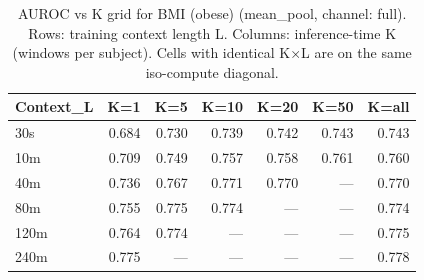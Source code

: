 \begin{table}[ht]
\centering
\caption{AUROC vs K grid for BMI (obese) (mean_pool, channel: full). Rows: training context length L. Columns: inference-time K (windows per subject). Cells with identical K×L are on the same iso-compute diagonal.}
\label{tab:kgrid_bmi_binary_mean_pool_full}
\begin{tabular}{lrrrrrr}
\toprule
Context_L & K=1 & K=5 & K=10 & K=20 & K=50 & K=all \\
\midrule
30s & 0.684 & 0.730 & 0.739 & 0.742 & 0.743 & 0.743 \\
10m & 0.709 & 0.749 & 0.757 & 0.758 & 0.761 & 0.760 \\
40m & 0.736 & 0.767 & 0.771 & 0.770 & — & 0.770 \\
80m & 0.755 & 0.775 & 0.774 & — & — & 0.774 \\
120m & 0.764 & 0.774 & — & — & — & 0.775 \\
240m & 0.775 & — & — & — & — & 0.778 \\
\bottomrule
\end{tabular}
\end{table}